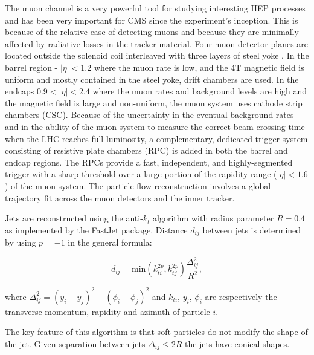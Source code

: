The muon channel is a very powerful tool for studying interesting HEP processes and has been very important for CMS since the experiment's inception. This is because of the relative ease of detecting muons and because they are minimally affected by radiative losses in the tracker material. Four muon detector planes are located outside the solenoid coil interleaved with three layers of steel yoke \cite{muon_tech_rep}. In the barrel region - $\left|\eta\right|<1.2$ where the muon rate is low, and the 4T magnetic field is uniform and mostly contained in the steel yoke, drift chambers are used. In the endcaps $0.9<\left|\eta\right|<2.4$ where the muon rates and background levels are high and the magnetic field is large and non-uniform, the muon system uses cathode strip chambers (CSC). Because of the uncertainty in the eventual background rates and in the ability of the muon system to measure the correct beam-crossing time when the LHC reaches full luminosity, a complementary, dedicated trigger system consisting of resistive plate chambers (RPC) is added in both the barrel and endcap regions.  The RPCs provide a fast, independent, and highly-segmented trigger with a sharp \pt threshold over a large portion of the rapidity range ($\left|\eta\right|<1.6$) of the muon system. The particle flow reconstruction involves a global trajectory fit across the muon detectors and the inner tracker. 

Jets are reconstructed using the anti-$k_{t}$ algorithm \cite{Cacciari:2008gp} with radius parameter $R=0.4$ as implemented by the FastJet \cite{Cacciari:2011ma} package. Distance $d_{ij}$ between jets is determined by using $p=-1$ in the general formula:

\begin{equation}
d_{ij}=\text{min}(k_{ti}^{2p}, k_{tj}^{2p})\frac{\Delta_{ij}^{2}}{R^{2}},
\end{equation}

where $\Delta_{ij}^{2} = (y_{i}-y_{j})^{2} + (\phi_{i} - \phi_{j})^{2}$ and $k_{ti}$, $y_{i}$, $\phi_{i}$ are respectively the transverse momentum, rapidity and azimuth of particle $i$. 

The key feature of this algorithm is that soft particles do not modify the shape of the jet. Given separation between jets $\Delta_{ij}\leq2R$ the jets have conical shapes. 
